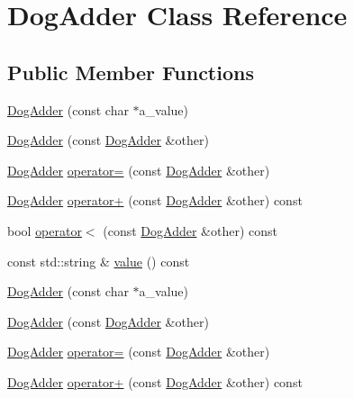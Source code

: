 \hypertarget{class_dog_adder}{}\section{Dog\+Adder Class Reference}
\label{class_dog_adder}
\subsection*{Public Member Functions}
\begin{DoxyCompactItemize}
\item 
\mbox{\hyperlink{class_dog_adder_a7fd76a2078834dc255c7dd7ac7c58f32}{Dog\+Adder}} (const char $\ast$a\+\_\+value)
\item 
\mbox{\hyperlink{class_dog_adder_a35bb24b649b63f38784dcb44d55c4d94}{Dog\+Adder}} (const \mbox{\hyperlink{class_dog_adder}{Dog\+Adder}} \&other)
\item 
\mbox{\hyperlink{class_dog_adder}{Dog\+Adder}} \mbox{\hyperlink{class_dog_adder_a13bd773069c15b083f876b8afd512247}{operator=}} (const \mbox{\hyperlink{class_dog_adder}{Dog\+Adder}} \&other)
\item 
\mbox{\hyperlink{class_dog_adder}{Dog\+Adder}} \mbox{\hyperlink{class_dog_adder_ad667166cdafb4352396e910faf09a55f}{operator+}} (const \mbox{\hyperlink{class_dog_adder}{Dog\+Adder}} \&other) const
\item 
bool \mbox{\hyperlink{class_dog_adder_a6d87d3ee06c0167e7552ba83daa629e7}{operator$<$}} (const \mbox{\hyperlink{class_dog_adder}{Dog\+Adder}} \&other) const
\item 
const std\+::string \& \mbox{\hyperlink{class_dog_adder_a76bb9e42f79e9d4adacd9e48a3a3c9fb}{value}} () const
\item 
\mbox{\hyperlink{class_dog_adder_a7fd76a2078834dc255c7dd7ac7c58f32}{Dog\+Adder}} (const char $\ast$a\+\_\+value)
\item 
\mbox{\hyperlink{class_dog_adder_a35bb24b649b63f38784dcb44d55c4d94}{Dog\+Adder}} (const \mbox{\hyperlink{class_dog_adder}{Dog\+Adder}} \&other)
\item 
\mbox{\hyperlink{class_dog_adder}{Dog\+Adder}} \mbox{\hyperlink{class_dog_adder_a13bd773069c15b083f876b8afd512247}{operator=}} (const \mbox{\hyperlink{class_dog_adder}{Dog\+Adder}} \&other)
\item 
\mbox{\hyperlink{class_dog_adder}{Dog\+Adder}} \mbox{\hyperlink{class_dog_adder_ad667166cdafb4352396e910faf09a55f}{operator+}} (const \mbox{\hyperlink{class_dog_adder}{Dog\+Adder}} \&other) const
\item 

\end{DoxyCompactItemize}
